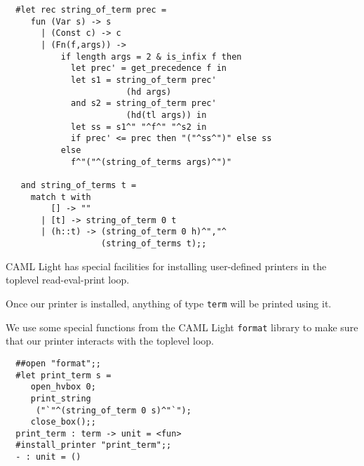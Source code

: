 \begin{slide*}


\vspace*{0.5cm}

\begin{black}\begin{footnotesize}\begin{verbatim}
  #let rec string_of_term prec =
     fun (Var s) -> s
       | (Const c) -> c
       | (Fn(f,args)) ->
           if length args = 2 & is_infix f then
             let prec' = get_precedence f in
             let s1 = string_of_term prec'
                        (hd args)
             and s2 = string_of_term prec'
                        (hd(tl args)) in
             let ss = s1^" "^f^" "^s2 in
             if prec' <= prec then "("^ss^")" else ss
           else
             f^"("^(string_of_terms args)^")"

   and string_of_terms t =
     match t with
         [] -> ""
       | [t] -> string_of_term 0 t
       | (h::t) -> (string_of_term 0 h)^","^
                   (string_of_terms t);;
\end{verbatim}\end{footnotesize}\end{black}

\end{slide*}




\begin{slide*}


\vspace*{0.5cm}

CAML Light has special facilities for installing user-defined printers in the
toplevel read-eval-print loop.

Once our printer is installed, anything of type {\black \tt term} will be
printed using it.

We use some special functions from the CAML Light {\tt format} library to make
sure that our printer interacts with the toplevel loop.

\begin{black}\begin{verbatim}
  ##open "format";;
  #let print_term s =
     open_hvbox 0;
     print_string
      ("`"^(string_of_term 0 s)^"`");
     close_box();;
  print_term : term -> unit = <fun>
  #install_printer "print_term";;
  - : unit = ()
\end{verbatim}\end{black}

\end{slide*}




